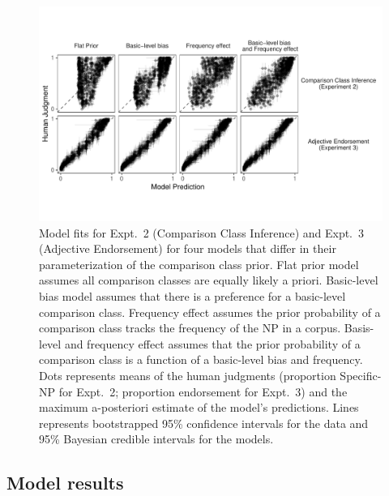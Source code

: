 \documentclass[doc]{apa6}
\begin{document}
\begin{figure}[t!]
\centering
\includegraphics[width=\textwidth]{figs/model_scatters_modelVariants.pdf}
\caption{Model fits for Expt.~2 (Comparison Class Inference) and Expt.~3 (Adjective Endorsement) for four models that differ in their parameterization of the comparison class prior. Flat prior model assumes all comparison classes are equally likely a priori. Basic-level bias model assumes that there is a preference for a basic-level comparison class. Frequency effect assumes the prior probability of a comparison class tracks the frequency of the NP in a corpus. Basis-level and frequency effect assumes that the prior probability of a comparison class is a function of a basic-level bias and frequency. Dots represents means of the human judgments (proportion Specific-NP for Expt.~2; proportion endorsement for Expt.~3) and the maximum a-posteriori estimate of the model's predictions. Lines represents bootstrapped 95\% confidence intervals for the data and 95\% Bayesian credible intervals for the models.}
\label{fig:scatters}
\end{figure}


\subsection{Model results}
\end{document}
